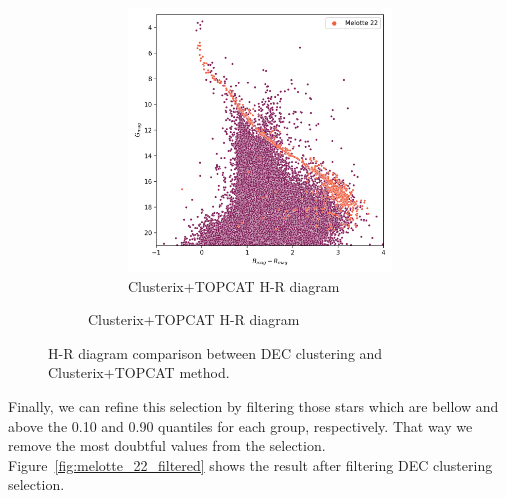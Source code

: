 \documentclass[11pt, a4paper, english]{book}
\begin{document}
\begin{figure}[htbp]
\begin{subfigure}{0.9\textwidth}
\begin{subfigure}[t]{0.45\textwidth}
      \includegraphics[width=\textwidth]{../figures/melotte_22/hr_diagram_melotte_22.png}
      \caption{Clusterix+TOPCAT H-R diagram}
    \end{subfigure}
  \end{subfigure}
  \caption{H-R diagram comparison between DEC clustering and Clusterix+TOPCAT method.}
  \label{fig:hr_diagram_comparison}
\end{figure}

Finally, we can refine this selection by filtering those stars which are bellow and above
the 0.10 and 0.90 quantiles for each group, respectively.
That way we remove the most doubtful values from the selection.
Figure~\ref{fig:melotte_22_filtered} shows the result after filtering DEC clustering selection.
\end{document}
